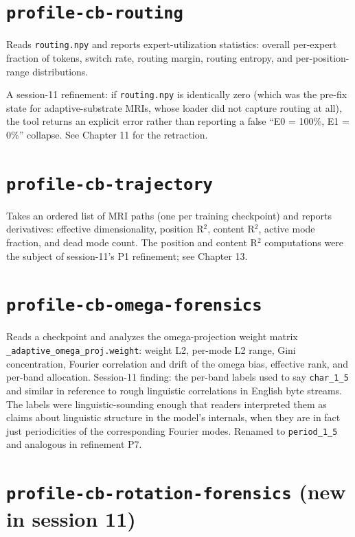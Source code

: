\documentclass[11pt,openany]{book}
\begin{document}
\section{\texttt{profile-cb-routing}}

Reads \texttt{routing.npy} and reports expert-utilization statistics:
overall per-expert fraction of tokens, switch rate,
routing margin, routing entropy, and per-position-range distributions.

A session-11 refinement: if \texttt{routing.npy} is identically zero
(which was the pre-fix state for adaptive-substrate MRIs, whose
loader did not capture routing at all), the tool returns an explicit
error rather than reporting a false ``E0 = 100\%, E1 = 0\%'' collapse.
See Chapter 11 for the retraction.

\section{\texttt{profile-cb-trajectory}}

Takes an ordered list of MRI paths (one per training checkpoint) and
reports derivatives: effective dimensionality, position R$^2$, content
R$^2$, active mode fraction, and dead mode count. The position and
content R$^2$ computations were the subject of session-11's P1
refinement; see Chapter 13.

\section{\texttt{profile-cb-omega-forensics}}

Reads a checkpoint and analyzes the omega-projection weight matrix
\texttt{\_adaptive\_omega\_proj.weight}: weight L2, per-mode L2 range,
Gini concentration, Fourier correlation and drift of the omega bias,
effective rank, and per-band allocation. Session-11 finding: the
per-band labels used to say \texttt{char\_1\_5} and similar in
reference to rough linguistic correlations in English byte streams.
The labels were linguistic-sounding enough that readers interpreted
them as claims about linguistic structure in the model's internals,
when they are in fact just periodicities of the corresponding Fourier
modes. Renamed to \texttt{period\_1\_5} and analogous in refinement P7.

\section{\texttt{profile-cb-rotation-forensics} (new in session 11)}
\end{document}
